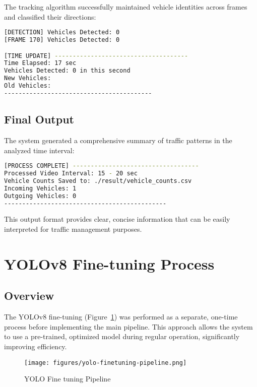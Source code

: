 \documentclass[9pt,a4paper,twoside]{rho-class/rho}
\begin{document}
    The tracking algorithm successfully maintained vehicle identities across frames and classified their directions:
    
    \begin{lstlisting}[caption=Tracking results example, language=bash]
[DETECTION] Vehicles Detected: 0
[FRAME 170] Vehicles Detected: 0

[TIME UPDATE] -------------------------------------
Time Elapsed: 17 sec
Vehicles Detected: 0 in this second
New Vehicles:
Old Vehicles:
-----------------------------------------
\end{lstlisting}
    
    \subsection{Final Output}
    
    The system generated a comprehensive summary of traffic patterns in the analyzed time interval:
    
    \begin{lstlisting}[caption=Final output example, language=bash]
[PROCESS COMPLETE] -----------------------------------
Processed Video Interval: 15 - 20 sec
Vehicle Counts Saved to: ./result/vehicle_counts.csv
Incoming Vehicles: 1
Outgoing Vehicles: 0
---------------------------------------------
\end{lstlisting}
    
    This output format provides clear, concise information that can be easily interpreted for traffic management purposes.

\section{YOLOv8 Fine-tuning Process}

    \subsection{Overview}
    
    The YOLOv8 fine-tuning (Figure~\ref{fig:yolov8_finetuning}) was performed as a separate, one-time process before implementing the main pipeline. This approach allows the system to use a pre-trained, optimized model during regular operation, significantly improving efficiency.
    \begin{figure}[h]
        \centering
        \texttt{[image: figures/yolo-finetuning-pipeline.png]}
        \caption{YOLO Fine tuning Pipeline }
        \label{fig:yolov8_finetuning}
    \end{figure}
    
\end{document}
